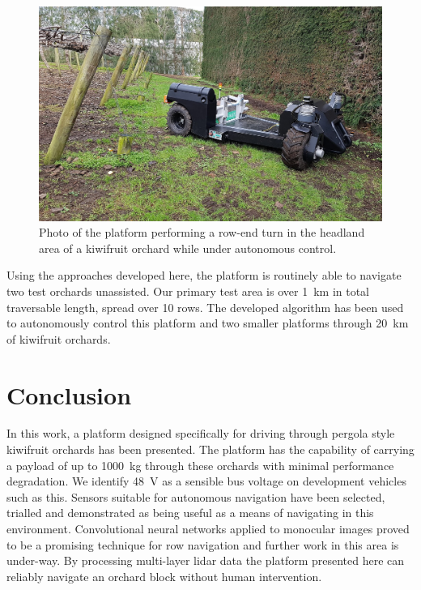 \documentclass[preprint,authoryear,12pt]{elsarticle}
\begin{document}
    \begin{figure}[htb]
        \centering
        \includegraphics[width=\linewidth]{imgs/photos/suzy_turning.jpg}
        \caption{
            Photo of the platform performing a row-end turn in the headland area of a kiwifruit orchard while under autonomous control.
        }
        \label{fig:suzy_turning}
    \end{figure}

    Using the approaches developed here, the platform is routinely able to navigate two test orchards unassisted.
    Our primary test area is over \SI{1}{\kilo\meter} in total traversable length, spread over 10 rows.
    The developed algorithm has been used to autonomously control this platform and two smaller platforms through \SI{20}{\kilo\meter} of kiwifruit orchards.


\section{Conclusion}
    In this work, a platform designed specifically for driving through pergola style kiwifruit orchards has been presented.
    The platform has the capability of carrying a payload of up to \SI{1000}{\kilo\gram} through these orchards with minimal performance degradation.
    We identify \SI{48}{\volt} as a sensible bus voltage on development vehicles such as this.
    Sensors suitable for autonomous navigation have been selected, trialled and demonstrated as being useful as a means of navigating in this environment.
    Convolutional neural networks applied to monocular images proved to be a promising technique for row navigation and further work in this area is under-way.
    By processing multi-layer lidar data the platform presented here can reliably navigate an orchard block without human intervention.
\end{document}
